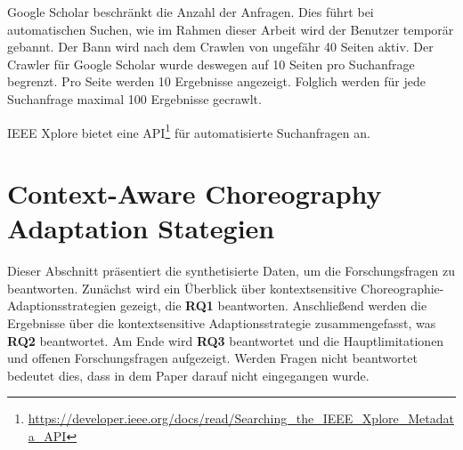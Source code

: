 \documentclass[conference,compsoc]{IEEEtran}
\begin{document}
Google Scholar beschränkt die Anzahl der Anfragen. Dies führt bei automatischen Suchen, wie im Rahmen dieser Arbeit wird der Benutzer temporär gebannt. Der Bann wird nach dem Crawlen von ungefähr 40 Seiten aktiv. Der Crawler für Google Scholar wurde deswegen auf 10 Seiten pro Suchanfrage begrenzt. Pro Seite werden 10 Ergebnisse angezeigt. Folglich werden für jede Suchanfrage maximal 100 Ergebnisse gecrawlt. 

IEEE Xplore bietet eine API\footnote{\url{https://developer.ieee.org/docs/read/Searching_the_IEEE_Xplore_Metadata_API}} für automatisierte Suchanfragen an.

%
%
%
%

\section{Context-Aware Choreography Adaptation Stategien}\label{s:contextAwareResults}
Dieser Abschnitt präsentiert die synthetisierte Daten, um die Forschungsfragen zu beantworten. Zunächst wird ein Überblick über  kontextsensitive Choreographie-Adaptionsstrategien gezeigt, die \textbf{RQ1} beantworten. Anschließend werden die Ergebnisse über die kontextsensitive Adaptionsstrategie zusammengefasst, was \textbf{RQ2} beantwortet. Am Ende wird \textbf{RQ3} beantwortet und die Hauptlimitationen und offenen Forschungsfragen aufgezeigt.
Werden Fragen nicht beantwortet bedeutet dies, dass in dem Paper darauf nicht eingegangen wurde.
\end{document}
